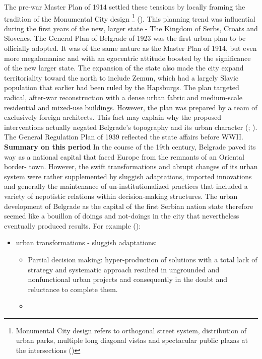 \documentclass[11pt]{report}
\begin{document}
{{{{The pre-war Master Plan of 1914 settled these tensions by locally framing the tradition of the Monumental City design 
\footnote{Monumental City design refers to orthogonal street system, distribution of urban parks, multiple long diagonal vistas and spectacular public plazas at the intersections (\href{Hirt}{\citealt{hirt_belgrade_2009}})}
(\href{Perovic}{\citealt{perovic_iskustva_2008}}).
This planning trend was influential during the first years of the new, larger state - The Kingdom of Serbs, Croats and Slovenes. The General Plan of Belgrade of 1923 was the first urban plan to be officially adopted. It was of the same nature as the Master Plan of 1914, but even more megalomaniac and with an egocentric attitude boosted by the significance of the new larger state.  The expansion of the state also made the city expand territoriality toward the north to include Zemun, which had a largely Slavic population that earlier had been ruled by the Hapsburgs. The plan targeted radical, after-war reconstruction with a dense urban fabric and medium-scale residential and mixed-use buildings. However, the plan was prepared by a team of exclusively foreign architects. This fact may explain why the proposed interventions actually negated Belgrade’s topography and its urban character  (\href{Grozdanic}{\citealt{grozdanic_belgrade_2008}}; \href{Blagojevic}{\citealt{blagojevic_urban_2009}}).
The General Regulation Plan of 1939 reflected the state affairs before WWII.
\\

\textbf{Summary on this period}
In the course of the 19th century, Belgrade paved its way as a national capital that faced Europe from the remnants of an Oriental border- town. However, the swift transformations and abrupt changes of its urban system were rather supplemented by sluggish adaptations, imported innovations and generally the maintenance of un-institutionalized practices that included a variety of nepotistic relations within decision-making structures. The urban development of Belgrade as the capital of the first Serbian nation state therefore seemed like a bouillon of doings and not-doings in the city that nevertheless eventually produced results. For example (\href{Dubravka}{\citealt{stojanovic_kontroverze_2015}}):

\begin{itemize}
\item urban transformations - sluggish adaptations:
\\
\begin{itemize}
\item Partial decision making: hyper-production of solutions with  a total lack of strategy and systematic approach resulted in ungrounded and nonfunctional urban projects and consequently in the doubt and reluctance to complete them.
\item 
\end{itemize}


\end{itemize}}}}}
\end{document}
